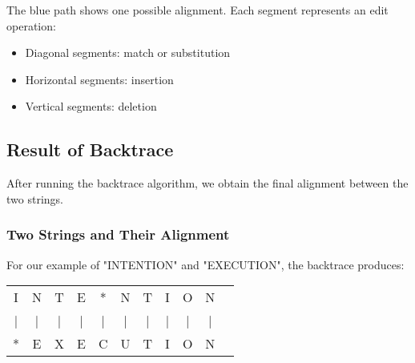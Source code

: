 \documentclass[11pt,a4paper]{article}
\theoremstyle{definition}
\theoremstyle{plain}
\theoremstyle{remark}
\begin{document}
\begin{center}
\end{center}

The blue path shows one possible alignment. Each segment represents an edit operation:
\begin{itemize}
    \item Diagonal segments: match or substitution
    \item Horizontal segments: insertion
    \item Vertical segments: deletion
\end{itemize}

\subsection{Result of Backtrace}

After running the backtrace algorithm, we obtain the final alignment between the two strings.

\subsubsection{Two Strings and Their Alignment}

For our example of "INTENTION" and "EXECUTION", the backtrace produces:

\begin{center}
\Large
\begin{tabular}{ccccccccccc}
I & N & T & E & * & N & T & I & O & N \\
| & | & | & | & | & | & | & | & | & | \\
* & E & X & E & C & U & T & I & O & N \\
\end{tabular}
\end{center}
\end{document}

